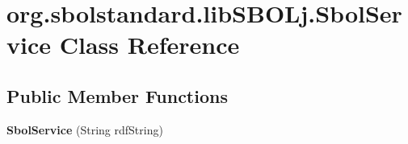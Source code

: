 \hypertarget{classorg_1_1sbolstandard_1_1lib_s_b_o_lj_1_1_sbol_service}{
\section{org.sbolstandard.libSBOLj.SbolService Class Reference}
\label{classorg_1_1sbolstandard_1_1lib_s_b_o_lj_1_1_sbol_service}
}
\subsection*{Public Member Functions}
\begin{DoxyCompactItemize}
\item 
\hypertarget{classorg_1_1sbolstandard_1_1lib_s_b_o_lj_1_1_sbol_service_ae4d52da83b28dd35957daf1b7a35bf3c}{
{\bfseries SbolService} (String rdfString)}
\label{classorg_1_1sbolstandard_1_1lib_s_b_o_lj_1_1_sbol_service_ae4d52da83b28dd35957daf1b7a35bf3c}


\end{DoxyCompactItemize}
